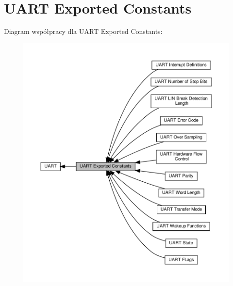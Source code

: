 \hypertarget{group___u_a_r_t___exported___constants}{}\section{U\+A\+RT Exported Constants}
\label{group___u_a_r_t___exported___constants}
Diagram współpracy dla U\+A\+RT Exported Constants\+:\nopagebreak
\begin{figure}[H]
\begin{center}
\leavevmode
\includegraphics[width=350pt]{group___u_a_r_t___exported___constants}
\end{center}
\end{figure}
